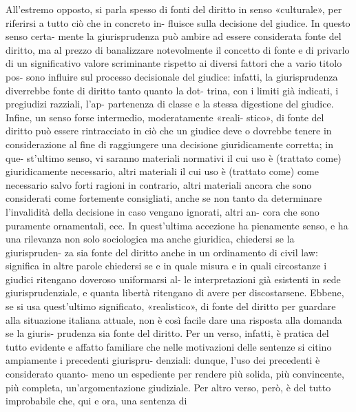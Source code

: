 All’estremo  opposto,  si  parla  spesso  di  fonti  del  diritto  in 
senso «culturale», per riferirsi a tutto ciò che in concreto in-
fluisce  sulla  decisione  del  giudice.  In  questo  senso  certa-
mente  la  giurisprudenza  può  ambire  ad  essere  considerata 
fonte del diritto, ma al prezzo di banalizzare notevolmente il 
concetto  di  fonte  e  di  privarlo  di  un  significativo  valore 
scriminante  rispetto  ai  diversi  fattori  che  a  vario  titolo  pos-
sono  influire  sul  processo  decisionale  del  giudice:  infatti,  la 
giurisprudenza diverrebbe fonte di diritto tanto quanto la dot-
trina,  con  i  limiti  già  indicati,  i  pregiudizi  razziali,  l’ap-
partenenza di classe e la stessa digestione del giudice.  
Infine,  un  senso  forse  intermedio,  moderatamente  «reali-
stico»,  di  fonte  del  diritto  può  essere  rintracciato  in  ciò  che 
un  giudice  deve  o  dovrebbe  tenere  in  considerazione  al  fine 
di raggiungere una decisione giuridicamente corretta; in que-
st’ultimo  senso,  vi  saranno  materiali  normativi  il  cui  uso  è 
(trattato  come)  giuridicamente  necessario,  altri  materiali  il 
cui uso  è (trattato come)  come  necessario  salvo forti ragioni 
in contrario, altri materiali ancora che sono considerati come 
fortemente  consigliati,  anche  se  non  tanto  da  determinare 
l’invalidità della decisione in caso vengano ignorati, altri an-
cora  che  sono  puramente  ornamentali,  ecc.  In  quest’ultima 
accezione  ha  pienamente  senso,  e  ha  una  rilevanza  non  solo 
sociologica ma anche giuridica, chiedersi se la giurispruden-
za sia fonte del diritto anche in un ordinamento di civil law: 
significa  in  altre  parole  chiedersi  se  e  in  quale  misura  e  in 
quali circostanze i giudici ritengano doveroso uniformarsi al-
le  interpretazioni  già  esistenti  in  sede  giurisprudenziale,  e 
quanta libertà ritengano di avere per discostarsene. 
Ebbene,  se  si  usa  quest’ultimo  significato,  «realistico»,  di 
fonte  del  diritto  per  guardare  alla  situazione  italiana  attuale, 
non è così facile dare una risposta alla domanda se la giuris-
prudenza  sia  fonte  del  diritto.  Per  un  verso,  infatti,  è  pratica 
del  tutto  evidente  e  affatto  familiare  che  nelle  motivazioni 
delle  sentenze  si  citino  ampiamente  i  precedenti  giurispru-
denziali:  dunque,  l’uso  dei  precedenti  è  considerato  quanto-
meno  un  espediente  per  rendere  più  solida,  più  convincente, 
più completa, un’argomentazione giudiziale.  Per  altro verso, 
però,  è  del  tutto  improbabile  che,  qui  e  ora,  una  sentenza  di 
